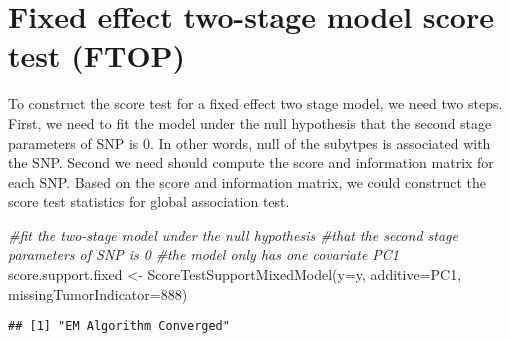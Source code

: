 \documentclass[11pt,]{article}
\newenvironment{Shaded}{\begin{snugshade}}{\end{snugshade}}
\newcommand{\AttributeTok}[1]{\textcolor[rgb]{0.77,0.63,0.00}{#1}}
\newcommand{\CommentTok}[1]{\textcolor[rgb]{0.56,0.35,0.01}{\textit{#1}}}
\newcommand{\DecValTok}[1]{\textcolor[rgb]{0.00,0.00,0.81}{#1}}
\newcommand{\FunctionTok}[1]{\textcolor[rgb]{0.00,0.00,0.00}{#1}}
\newcommand{\NormalTok}[1]{#1}
\newcommand{\OtherTok}[1]{\textcolor[rgb]{0.56,0.35,0.01}{#1}}
\begin{document}
\hypertarget{fixed-effect-two-stage-model-score-test-ftop}{%
\section{Fixed effect two-stage model score test
(FTOP)}\label{fixed-effect-two-stage-model-score-test-ftop}}

To construct the score test for a fixed effect two stage model, we need
two steps. First, we need to fit the model under the null hypothesis
that the second stage parameters of SNP is 0. In other words, null of
the subytpes is associated with the SNP. Second we need should compute
the score and information matrix for each SNP. Based on the score and
information matrix, we could construct the score test statistics for
global association test.

\begin{Shaded}
\begin{Highlighting}[]
\CommentTok{\#fit the two{-}stage model under the null hypothesis}
\CommentTok{\#that the second stage parameters of SNP is 0}
\CommentTok{\#the model only has one covariate PC1}
\NormalTok{score.support.fixed }\OtherTok{\textless{}{-}} \FunctionTok{ScoreTestSupportMixedModel}\NormalTok{(}\AttributeTok{y=}\NormalTok{y,}
                                                  \AttributeTok{additive=}\NormalTok{PC1,}
                                                  \AttributeTok{missingTumorIndicator=}\DecValTok{888}\NormalTok{)}
\end{Highlighting}
\end{Shaded}

\begin{verbatim}
## [1] "EM Algorithm Converged"
\end{verbatim}
\end{document}
